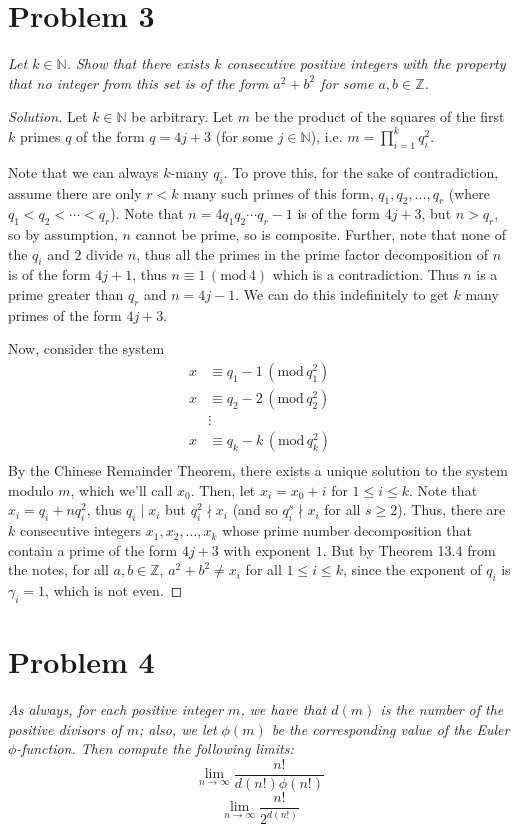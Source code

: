 \documentclass{article}
\newcommand{\N}{{\mathbb N}}
\newcommand{\Z}{{\mathbb Z}}
\begin{document}
\section{Problem 3}
{\it Let $k \in \N$. Show that there exists $k$ consecutive positive integers
with the property that no integer from this set is of the form
$a^2 + b^2$ for some $a,b \in \Z$.}
\begin{proof}[Solution]
	Let $k \in \N$ be arbitrary.
	Let $m$ be the product of the squares of the first
	$k$ primes $q$ of the form $q = 4j + 3$
	(for some $j \in \N$),
	i.e. $m = \prod_{i=1}^k q^2_i$.
	
	Note that we can always $k$-many $q_i$.
	To prove this, for the sake of contradiction,
	assume there are only $r < k$ many such primes of this form,
	$q_1,q_2,\dots,q_r$
	(where $q_1 < q_2 < \cdots < q_r$).
	Note that $n = 4q_1q_2\cdots q_r -1$ is of the form $4j+3$,
	but $n > q_r$, so by assumption,
	$n$ cannot be prime,
	so is composite.
	Further, note that none of the $q_i$ and $2$ divide $n$,
	thus all the primes in the prime factor decomposition of $n$
	is of the form $4j + 1$, thus $n \equiv 1\, (\mathrm{mod}\, 4)$
	which is a contradiction.
	Thus $n$ is a prime greater than $q_r$ and $n = 4j - 1$.
	We can do this indefinitely to get $k$ many primes of the form $4j + 3$.

	Now, consider the system
	\begin{align*}
		x &\equiv q_1 - 1 \, (\mathrm{mod}\, q_1^2)\\
		x &\equiv q_2 - 2 \, (\mathrm{mod}\, q_2^2)\\
		  &\vdots\\
		x &\equiv q_k - k \, (\mathrm{mod}\, q_k^2)\\
	\end{align*}
	By the Chinese Remainder Theorem,
	there exists a unique solution to the system modulo $m$,
	which we'll call $x_0$.
	Then, let $x_i = x_0 + i$ for $1 \leq i \leq k$.
	Note that $x_i = q_i + nq_i^2$,
	thus $q_i \mid x_i$ but $q_i^2 \nmid x_i$
	(and so $q_i^s \nmid x_i$ for all $s \geq 2$).
	Thus, there are $k$ consecutive integers $x_1,x_2,\dots,x_k$
	whose prime number decomposition that contain
	a prime of the form $4j+3$ with exponent $1$.
	But by Theorem 13.4 from the notes,
	for all $a,b \in \Z$, $a^2 + b^2 \neq x_i$ for all $1 \leq i \leq k$,
	since the exponent of $q_i$ is $\gamma_i = 1$,
	which is not even.
\end{proof}
\clearpage

\section{Problem 4}
{\it As always, for each positive integer $m$,
we have that $d(m)$ is the number of the positive divisors of $m$;
also, we let $\phi(m)$ be the corresponding value of
the Euler $\phi$-function.
Then compute the following limits:
\[
	\lim_{n\to\infty}\frac{n!}{d(n!)\phi(n!)}
\]
\[
	\lim_{n\to\infty} \frac{n!}{2^{d(n!)}}
\]}
\end{document}
